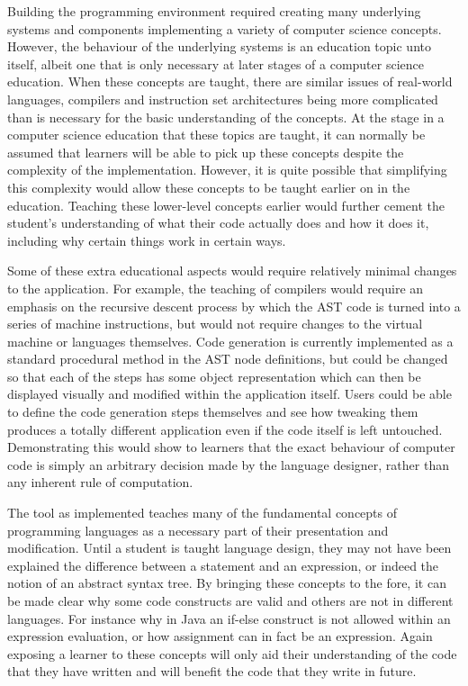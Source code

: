 Building the programming environment required creating many underlying systems and components implementing a variety of computer science concepts. However, the behaviour of the underlying systems is an education topic unto itself, albeit one that is only necessary at later stages of a computer science education. When these concepts are taught, there are similar issues of real-world languages, compilers and instruction set architectures being more complicated than is necessary for the basic understanding of the concepts. At the stage in a computer science education that these topics are taught, it can normally be assumed that learners will be able to pick up these concepts despite the complexity of the implementation. However, it is quite possible that simplifying this complexity would allow these concepts to be taught earlier on in the education. Teaching these lower-level concepts earlier would further cement the student's understanding of what their code actually does and how it does it, including why certain things work in certain ways.

Some of these extra educational aspects would require relatively minimal changes to the application. For example, the teaching of compilers would require an emphasis on the recursive descent process by which the AST code is turned into a series of machine instructions, but would not require changes to the virtual machine or languages themselves. Code generation is currently implemented as a standard procedural method in the AST node definitions, but could be changed so that each of the steps has some object representation which can then be displayed visually and modified within the application itself. Users could be able to define the code generation steps themselves and see how tweaking them produces a totally different application even if the code itself is left untouched. Demonstrating this would show to learners that the exact behaviour of computer code is simply an arbitrary decision made by the language designer, rather than any inherent rule of computation.

The tool as implemented teaches many of the fundamental concepts of programming languages as a necessary part of their presentation and modification. Until a student is taught language design, they may not have been explained the difference between a statement and an expression, or indeed the notion of an abstract syntax tree. By bringing these concepts to the fore, it can be made clear why some code constructs are valid and others are not in different languages. For instance why in Java an if-else construct is not allowed within an expression evaluation, or how assignment can in fact be an expression. Again exposing a learner to these concepts will only aid their understanding of the code that they have written and will benefit the code that they write in future.

